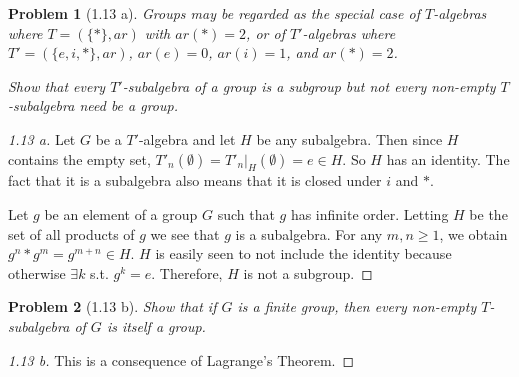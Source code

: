 \documentclass{article}
\theoremstyle{problemstyle}
\newtheorem{problem}{Problem}
\begin{document}
\begin{problem}[1.13 a]
Groups may be regarded as the special case of $T$-algebras where $T = (\{*\},ar)$
 with $ar(*) = 2$, or of $T'$-algebras where $T' = (\{e,i,*\},ar)$, $ar(e) = 0$, $ar(i) = 1$, and $ar(*) = 2$.  
 
Show that every $T'$-subalgebra of a group is a subgroup but not every non-empty $T$-subalgebra need be a group.
\end{problem}
\begin{proof}[1.13 a]
Let $G$ be a $T'$-algebra and let $H$ be any subalgebra. Then since $H$ contains the empty set, $T'_n(\emptyset) = T'_n|_H(\emptyset) = e \in H$. So $H$ has an identity. The fact that it is a subalgebra also means that it is closed under $i$ and $*$. 

Let $g$ be an element of a group $G$ such that $g$ has infinite order. Letting $H$ be the set of all products of $g$ we see that $g$ is a subalgebra. For any $m,n \geq 1$, we obtain $g^n * g^m = g^{m+n} \in H$. $H$ is easily seen to not include the identity because otherwise $\exists k$ s.t. $g^k = e$. Therefore, $H$ is not a subgroup. 
\end{proof}
\begin{problem}[1.13 b]
Show that if $G$ is a finite group, then every non-empty $T$-subalgebra of $G$ is itself a group.
\end{problem}
\begin{proof}[1.13 b]
This is a consequence of Lagrange's Theorem. 
\end{proof}
\end{document}
